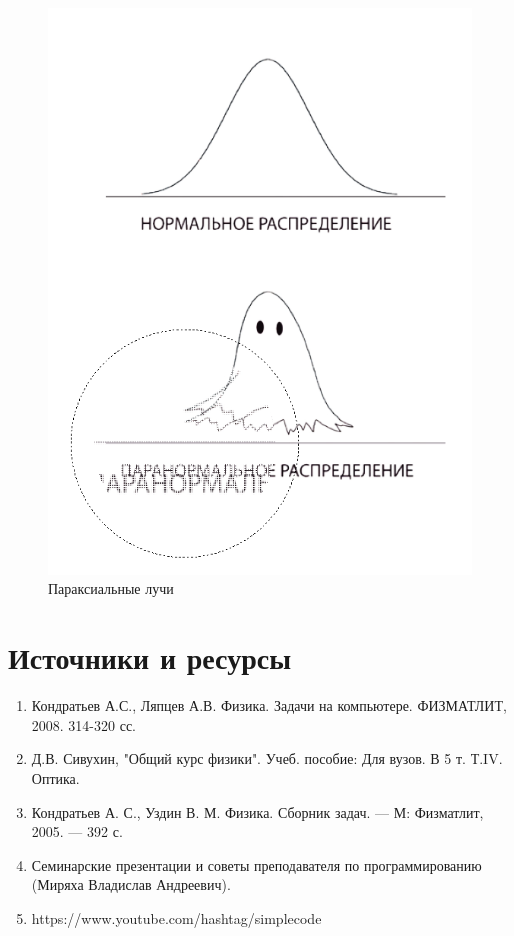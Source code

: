 \documentclass[a4paper,12pt]{article} %
\begin{document}
\begin{figure}[h!]
	\centering
	\includegraphics[scale=0.95]{пара_пара.png}
	\caption{Параксиальные лучи}
\end{figure}

\newpage

\section{Источники и ресурсы}

\begin{enumerate}
  \item Кондратьев А.С., Ляпцев А.В. Физика. Задачи на компьютере. ФИЗМАТЛИТ, 2008. 314-320 сс.

  \item Д.В. Сивухин, "Общий курс физики". Учеб. пособие: Для вузов. В 5 т. Т.IV. Оптика.
  
  \item Кондратьев А. С., Уздин В. М. Физика. Сборник задач. — М: Физматлит, 2005. — 392 с.

  \item Семинарские презентации и советы преподавателя по программированию (Миряха Владислав Андреевич).
  
  \item https://www.youtube.com/hashtag/simplecode
\end{enumerate}
\end{document}
